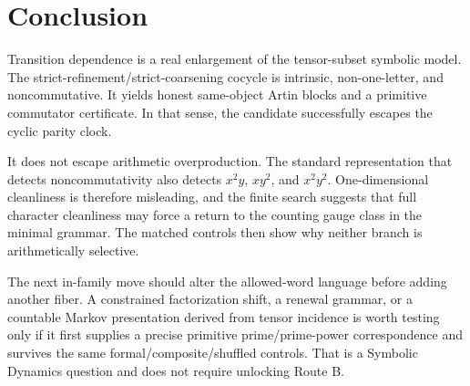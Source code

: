 \section{Conclusion}
\label{sec:conclusion}

Transition dependence is a real enlargement of the tensor-subset symbolic
model.  The strict-refinement/strict-coarsening cocycle is intrinsic,
non-one-letter, and noncommutative.  It yields honest same-object Artin
blocks and a primitive commutator certificate.  In that sense, the candidate
successfully escapes the cyclic parity clock.

It does not escape arithmetic overproduction.  The standard representation
that detects noncommutativity also detects $x^2y$, $xy^2$, and $x^2y^2$.
One-dimensional cleanliness is therefore misleading, and the finite search
suggests that full character cleanliness may force a return to the counting
gauge class in the minimal grammar.  The matched controls then show why
neither branch is arithmetically selective.

The next in-family move should alter the allowed-word language before adding
another fiber.  A constrained factorization shift, a renewal grammar, or a
countable Markov presentation derived from tensor incidence is worth testing
only if it first supplies a precise primitive prime/prime-power
correspondence and survives the same formal/composite/shuffled controls.
That is a Symbolic Dynamics question and does not require unlocking Route B.
